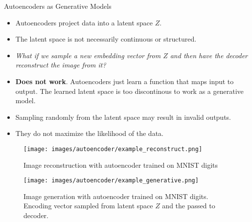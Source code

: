 \begin{frame}[allowframebreaks]{Autoencoders as Generative Models}
\begin{itemize}
    \item Autoencoders project data into a latent space $Z$.
    \item The latent space is not necessarily continuous or structured.
    \item \textit{What if we sample a new embedding vector from $Z$ and then have the decoder reconstruct the image from it?}
    \item \textbf{Does not work}. Autoencoders just learn a function that maps input to output. The learned latent space is too discontinous to work as a generative model.
    \item Sampling randomly from the latent space may result in invalid outputs.
    \item They do not maximize the likelihood of the data.
\end{itemize}

\framebreak
\begin{figure}
    \centering
    \texttt{[image: images/autoencoder/example\_reconstruct.png]}
    \caption{Image reconstruction with autoencoder trained on MNIST digits}
\end{figure}

\framebreak
\begin{figure}
    \centering
    \texttt{[image: images/autoencoder/example\_generative.png]}
    \caption{Image generation with autoencoder trained on MNIST digits. Encoding vector sampled from latent space $Z$ and the passed to decoder.}
\end{figure}

\end{frame}